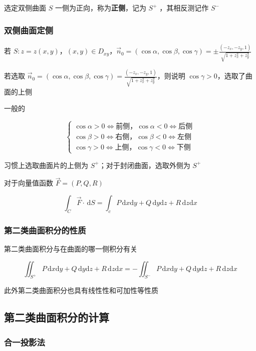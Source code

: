\documentclass[lang = zh , final , oneside , openany , titlepage , zihao = -4 , linespread = 1.3 , baselineskip = false , cjk-font = windows , text-font = newtx , math-font = newtx , math-style = ISO , uppercase-greek = upright , integral-limits = false]{sjtureport}
\begin{document}
选定双侧曲面 \(S\) 一侧为正向，称为\textbf{正侧}，记为 \(S^+\)
，其相反测记作 \(S^-\)

\subsubsection{双侧曲面定侧}

若
\(S:z=z(x,y)\)，\((x,y)\in D_{xy}\)，\(\vec{n}_0=\left(\cos\alpha,\cos\beta,\cos\gamma\right)=\pm\frac{\left(-z_x,-z_y,1\right)}{\sqrt{1+z_x^2+z_y^2}}\)

若选取
\(\vec{n}_0=\left(\cos\alpha,\cos\beta,\cos\gamma\right)=\frac{\left(-z_x,-z_y,1\right)}{\sqrt{1+z_x^2+z_y^2}}\)，则说明
\(\cos\gamma > 0\)，选取了曲面的上侧

一般的

\[\left\{\begin{aligned}
  \cos\alpha >0 \Leftrightarrow \text{前侧}，\cos\alpha < 0 \Leftrightarrow \text{后侧}\\
  \cos\beta >0 \Leftrightarrow \text{右侧}，\cos\beta < 0 \Leftrightarrow \text{左侧}\\
  \cos\gamma >0 \Leftrightarrow \text{上侧}，\cos\gamma < 0 \Leftrightarrow \text{下侧}
\end{aligned}\right.\]

习惯上选取曲面片的上侧为 \(S^+\)；对于封闭曲面，选取外侧为 \(S^+\)

对于向量值函数 \(\vec{F} = (P,Q,R)\)

\[\int_C \vec{F}\cdot\,\mathrm{d}S = \int_c P\,\mathrm{d}x\mathrm{d}y + Q\,\mathrm{d}y\mathrm{d}z + R\,\mathrm{d}z\mathrm{d}x\]

\subsubsection{第二类曲面积分的性质}

第二类曲面积分与在曲面的哪一侧积分有关

\[\iint_{S^+}P\,\mathrm{d}x\mathrm{d}y + Q\,\mathrm{d}y\mathrm{d}z + R\,\mathrm{d}z\mathrm{d}x = -\iint_{S^-}P\,\mathrm{d}x\mathrm{d}y + Q\,\mathrm{d}y\mathrm{d}z + R\,\mathrm{d}z\mathrm{d}x\]

此外第二类曲面积分也具有线性性和可加性等性质

\subsection{第二类曲面积分的计算}

\subsubsection{合一投影法}
\end{document}
